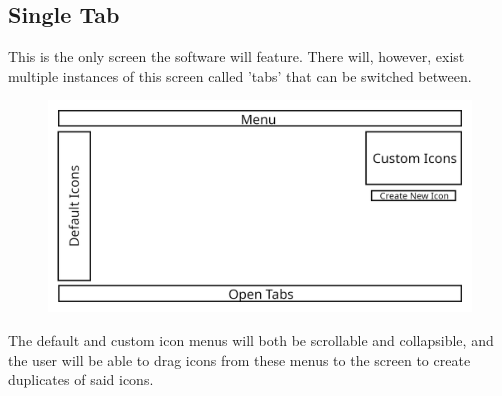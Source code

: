 \documentclass{article}
\begin{document}
        \subsection{Single Tab}
        This is the only screen the software will feature. There will, however, exist multiple instances of this screen
        called 'tabs' that can be switched between.
        \begin{figure}[H]
            \includegraphics[width=\textwidth]{include/main_screen.png}
            \centering
        \end{figure}

        The default and custom icon menus will both be scrollable and collapsible, and the user will be able to drag
        icons from these menus to the screen to create duplicates of said icons.
\end{document}
